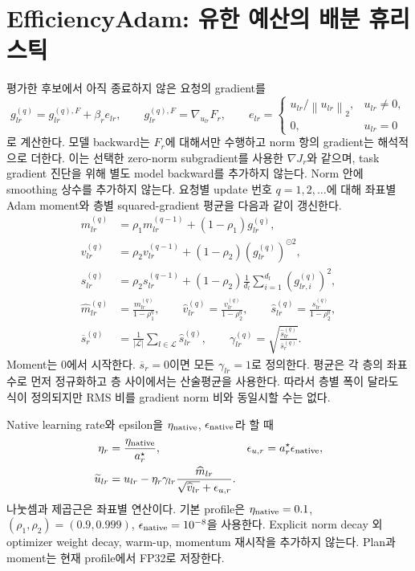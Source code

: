 \documentclass[11pt]{article}
\newcommand{\norm}[1]{\left\lVert #1\right\rVert}
\begin{document}
\section{EfficiencyAdam: 유한 예산의 배분 휴리스틱}
평가한 후보에서 아직 종료하지 않은 요청의 gradient를
\begin{equation}
 g^{(q)}_{lr}=g^{(q),F}_{lr}+\beta_r e_{lr},\qquad
 g^{(q),F}_{lr}=\nabla_{u_{lr}}F_r,\qquad
 e_{lr}=\begin{cases}
 u_{lr}/\norm{u_{lr}}_2,&u_{lr}\ne0,\\
 0,&u_{lr}=0
 \end{cases}
 \label{eq:gradient}
\end{equation}
로 계산한다. 모델 backward는 $F_r$에 대해서만 수행하고 norm 항의
gradient는 해석적으로 더한다. 이는 선택한 zero-norm subgradient를
사용한 $\nabla J_r$와 같으며, task gradient 진단을 위해 별도 model
backward를 추가하지 않는다. Norm 안에 smoothing 상수를 추가하지 않는다.
요청별 update 번호 $q=1,2,\ldots$에 대해 좌표별 Adam moment와
층별 squared-gradient 평균을 다음과 같이 갱신한다.
\begin{align}
 m^{(q)}_{lr}&=\rho_1m^{(q-1)}_{lr}+(1-\rho_1)g^{(q)}_{lr},\\
 v^{(q)}_{lr}&=\rho_2v^{(q-1)}_{lr}+(1-\rho_2)(g^{(q)}_{lr})^{\odot2},\\
 s^{(q)}_{lr}&=\rho_2s^{(q-1)}_{lr}
 +(1-\rho_2)\frac1{d_l}\sum_{i=1}^{d_l}(g^{(q)}_{lr,i})^2,\\
 \widehat m^{(q)}_{lr}&=\frac{m^{(q)}_{lr}}{1-\rho_1^q},\qquad
 \widehat v^{(q)}_{lr}=\frac{v^{(q)}_{lr}}{1-\rho_2^q},\qquad
 \widehat s^{(q)}_{lr}=\frac{s^{(q)}_{lr}}{1-\rho_2^q},\\
 \overline s^{(q)}_r&=\frac1{|\mathcal L|}
                      \sum_{l\in\mathcal L}\widehat s^{(q)}_{lr},\qquad
 \gamma^{(q)}_{lr}=\sqrt{\frac{\widehat s^{(q)}_{lr}}
                                   {\overline s^{(q)}_r}}.
 \label{eq:gamma}
\end{align}
Moment는 0에서 시작한다. $\overline s_r=0$이면 모든 $\gamma_{lr}=1$로
정의한다. 평균은 각 층의 좌표 수로 먼저 정규화하고
층 사이에서는 산술평균을 사용한다. 따라서 층별 폭이 달라도 식이
정의되지만 RMS 비를 gradient norm 비와 동일시할 수는 없다.

Native learning rate와 epsilon을 $\eta_{\rm native}$,
$\epsilon_{\rm native}$라 할 때
\begin{align}
 \eta_r&=\frac{\eta_{\rm native}}{a^\star_r},&
 \epsilon_{u,r}&=a^\star_r\epsilon_{\rm native},\\
 \widetilde u_{lr}&=u_{lr}
 -\eta_r\gamma_{lr}
 \frac{\widehat m_{lr}}{\sqrt{\widehat v_{lr}}+\epsilon_{u,r}}.
 \label{eq:adam}
\end{align}
나눗셈과 제곱근은 좌표별 연산이다. 기본 profile은
$\eta_{\rm native}=0.1$, $(\rho_1,\rho_2)=(0.9,0.999)$,
$\epsilon_{\rm native}=10^{-8}$을 사용한다.
Explicit norm decay 외 optimizer weight decay, warm-up, momentum 재시작을
추가하지 않는다. Plan과 moment는 현재 profile에서 FP32로 저장한다.
\end{document}
